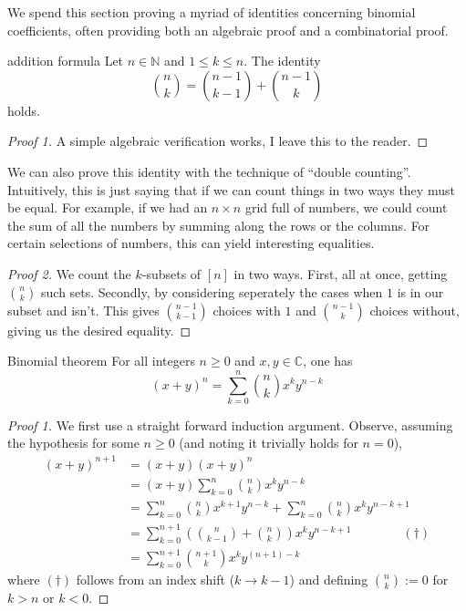\documentclass{article}
\newcounter{statementcount}
\begin{document}
\setcounter{statementcount}{1}

We spend this section proving a myriad of identities concerning binomial coefficients, often providing both an algebraic proof and 
a combinatorial proof.

\begin{lemma}[]{addition formula}
    Let $n \in \mathbb{N}$ and $1 \leq k \leq n$. The identity \[\binom{n}{k} = \binom{n-1}{k-1} + \binom{n-1}{k}\] holds.
\end{lemma}

\begin{proof}[Proof 1]
    A simple algebraic verification works, I leave this to the reader.
\end{proof}

We can also prove this identity with the technique of ``double counting''. Intuitively, this is just saying that if we can count things in two 
ways they must be equal. For example, if we had an $n \times n$ grid full of numbers, we could count the sum of all the numbers by summing along 
the rows or the columns. For certain selections of numbers, this can yield interesting equalities.  

\begin{proof}[Proof 2]
    We count the $k$-subsets of $[n]$ in two ways. First, all at once, getting $\binom{n}{k}$ such sets. Secondly, by considering seperately the 
    cases when $1$ is in our subset and isn't. This gives $\binom{n-1}{k-1}$ choices with $1$ and $\binom{n-1}{k}$ choices without, giving us the 
    desired equality. 
\end{proof}


\begin{theorem}[]{Binomial theorem}
    For all integers $n \geq 0$ and $x, y \in \mathbb{C}$, one has
    \[(x + y)^n = \sum_{k=0}^n \binom{n}{k}x^ky^{n-k}\]
\end{theorem}

\begin{proof}[Proof 1]
    We first use a straight forward induction argument. Observe, assuming the hypothesis for some $n \geq 0$ (and noting it trivially holds for $n=0$),
    \begin{align*}
        (x+y)^{n+1} &= (x+y)(x+y)^n \\
        &= (x+y)\sum_{k=0}^n \binom{n}{k}x^k y^{n-k} \\
        &= \sum_{k=0}^n \binom{n}{k}x^{k+1}y^{n-k} + \sum_{k=0}^n \binom{n}{k}x^k y^{n-k+1} \\
        &= \sum_{k=0}^{n+1} \left(\binom{n}{k-1} + \binom{n}{k}\right)x^ky^{n - k + 1} \qquad \qquad (\dagger)\\
        &= \sum_{k=0}^{n+1}\binom{n+1}{k}x^ky^{(n+1)-k}
    \end{align*}
    where $(\dagger)$ follows from an index shift ($k \to k-1$) and defining $\binom{n}{k} := 0$ for $k > n$ or $k < 0$.
\end{proof}
\end{document}
